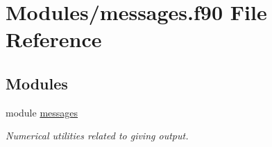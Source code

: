 \hypertarget{messages_8f90}{}\section{Modules/messages.f90 File Reference}
\label{messages_8f90}
\subsection*{Modules}
\begin{DoxyCompactItemize}
\item 
module \hyperlink{namespacemessages}{messages}
\begin{DoxyCompactList}\small\item\em Numerical utilities related to giving output. \end{DoxyCompactList}\end{DoxyCompactItemize}
